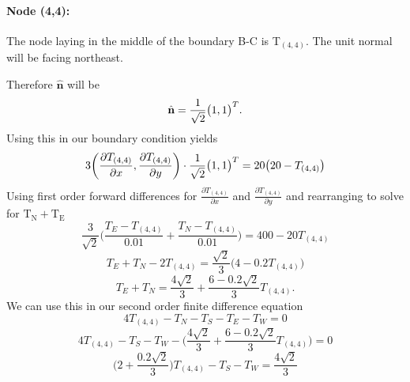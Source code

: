 \documentclass[12pt,a4paper]{article}
\begin{document}
\paragraph*{Node (4,4):} The node laying in the middle of the boundary B-C is T$_{(4,4)}$. The unit normal will be facing northeast.
\begin{center}
\end{center}
Therefore $\hat{{\textbf{n}}}$ will be
\[\hat{\textbf{n}}=\frac{1}{\sqrt{2}}\big{(}1,1\big{)}^T.\]
Using this in our boundary condition yields
\[3\bigg{(}\frac{\partial T_{(4,4)}}{\partial x},\frac{\partial T_{(4,4)}}{\partial y}\bigg{)}\cdot\frac{1}{\sqrt{2}}\big{(}1,1\big{)}^T=20\big{(}20-T_{(4,4)}\big{)}\]
Using first order forward differences for $\frac{\partial T_{(4,4)}}{\partial x}$ and $\frac{\partial T_{(4,4)}}{\partial y}$ and rearranging to solve for $\text{T}_\text{N}+\text{T}_\text{E}$
\[\frac{3}{\sqrt{2}}\bigg(\frac{T_E-T_{(4,4)}}{0.01}+\frac{T_N-T_{(4,4)}}{0.01}\bigg)=400-20T_{(4,4)}\]
\[T_E+T_N-2T_{(4,4)}=\frac{\sqrt{2}}{3}\big(4-0.2T_{(4,4)}\big)\]
\[T_E+T_N=\frac{4\sqrt{2}}{3}+\frac{6-0.2\sqrt{2}}{3}T_{(4,4)}.\]
We can use this in our second order finite difference equation 
\[4T_{(4,4)}-T_N-T_S-T_E-T_W=0\]
\[4T_{(4,4)}-T_S-T_W-\bigg(\frac{4\sqrt{2}}{3}+\frac{6-0.2\sqrt{2}}{3}T_{(4,4)}\bigg)=0\]
\[\bigg(2+\frac{0.2\sqrt{2}}{3}\bigg)T_{(4,4)}-T_S-T_W=\frac{4\sqrt{2}}{3}\]
\end{document}
